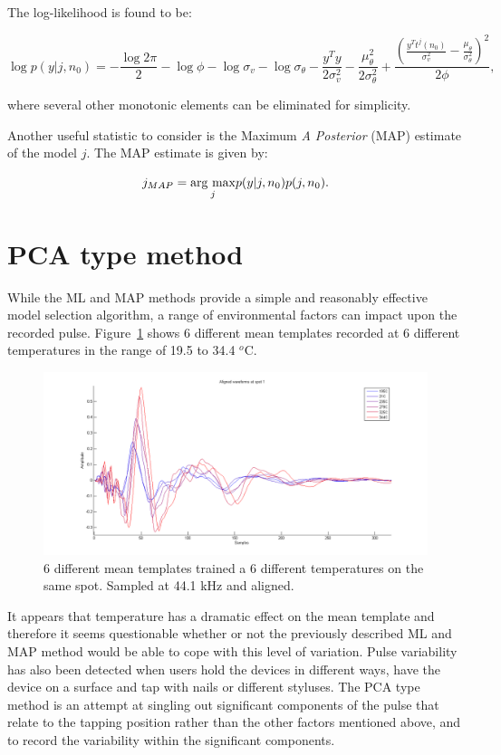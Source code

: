 The log-likelihood is found to be:

\begin{equation}\label{eq:MLloglikelihood}
\log{p(y|j,n_0)} = -\frac{\log{2\pi}}{2} - \log{\phi} - \log{\sigma_v} -\log{\sigma_\theta} - \frac{y^T y}{2\sigma_v^2} -\frac{\mu^2_\theta}{2\sigma^2_\theta} + \frac{\left(\frac{y^T t^j(n_0)}{\sigma^2_v}-\frac{\mu_\theta}{\sigma^2_\theta}\right)^2}{2\phi},
\end{equation}

where several other monotonic elements can be eliminated for simplicity.

Another useful statistic to consider is the Maximum \emph{A Posterior} (MAP) estimate of the model $j$. The MAP estimate is given by:

\begin{equation}\label{eq:MAPdefinition}
j_{MAP} = \underset{j}{\mathrm{arg~max}} p(y|j,n_0)p(j,n_0).
\end{equation}


\section{PCA type method}\label{sec:APRpca}
While the ML and MAP methods provide a simple and reasonably effective model selection algorithm, a range of environmental factors can impact upon the recorded pulse. Figure~\ref{fig:shiftOverTemperature} shows 6 different mean templates recorded at 6 different temperatures in the range of 19.5 to 34.4 $^o$C.

\begin{figure}[!]
\centering
\includegraphics[width=150mm]{shiftOverTemperature.png}
\caption{6 different mean templates trained a 6 different temperatures on the same spot. Sampled at 44.1 kHz and aligned.}\label{fig:shiftOverTemperature}
\end{figure}
It appears that temperature has a dramatic effect on the mean template and therefore it seems questionable whether or not the previously described ML and MAP method would be able to cope with this level of variation. Pulse variability has also been detected when users hold the devices in different ways, have the device on a surface and tap with nails or different styluses. The PCA type method is an attempt at singling out significant components of the pulse that relate to the tapping position rather than the other factors mentioned above, and to record the variability within the significant components.

